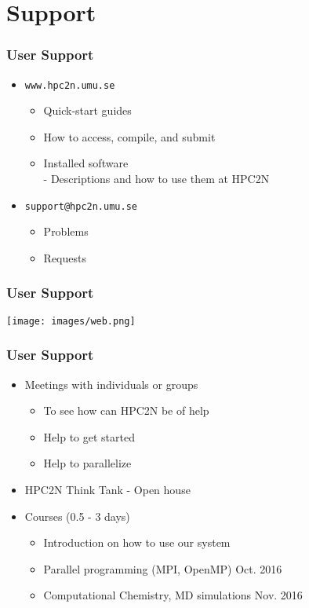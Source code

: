 %


\section{Support}
\begin{frame}
	\frametitle{User Support}

	\begin{itemize}
		\item	\texttt{www.hpc2n.umu.se}
			\begin{itemize}
				\item	Quick-start guides
				\item	How to access, compile, and submit
				\item	Installed software\\
						- Descriptions and how to use them at HPC2N
			\end{itemize}
		\item	\texttt{support@hpc2n.umu.se}
			\begin{itemize}
				\item	Problems
				\item	Requests
			\end{itemize}
	\end{itemize}

\end{frame}

\begin{frame}
	\frametitle{User Support}

\texttt{[image: images/web.png]}

\end{frame}

\begin{frame}
	\frametitle{User Support}

	\begin{itemize}
		\item	Meetings with individuals or groups
			\begin{itemize}
				\item	To see how can HPC2N be of help
				\item	Help to get started
				\item	Help to parallelize
			\end{itemize}
		\item	HPC2N Think Tank - Open house
		\item	Courses (0.5 - 3 days)
			\begin{itemize}
				\item	Introduction on how to use our system
				\item	Parallel programming (MPI, OpenMP) Oct. 2016
				\item	Computational Chemistry, MD simulations Nov. 2016
			\end{itemize}
	\end{itemize}

\end{frame}

